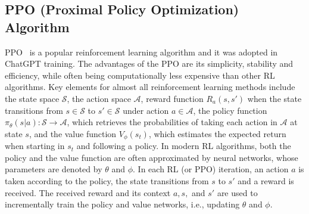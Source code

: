 \subsection{PPO (Proximal Policy Optimization) Algorithm}
\label{sec:ppo_background}

PPO~\cite{schulman2017PPOclip} is a popular reinforcement learning algorithm and it was adopted in ChatGPT training. The advantages of the PPO are its simplicity, stability and efficiency, while often being computationally less expensive than other RL algorithms. Key elements for almost all reinforcement learning methods include the state space $\mathcal{S}$, the action space $\mathcal{A}$, reward function $R_a(s, s')$ when the state transitions from $s\in \mathcal{S}$ to $s' \in \mathcal{S}$ under action $a \in \mathcal{A}$, the policy function $\pi_\theta(s|a){:}\mathcal{S} {\rightarrow} \mathcal{A}$, which retrieves the probabilities of taking each action in $\mathcal{A}$ at state $s$,
and the value function $V_\phi(s_t)$, which estimates the expected return when starting in $s_t$ and following a policy. In modern RL algorithms, both the policy and the value function are often approximated by neural networks, whose parameters are denoted by 
$\theta$ and $\phi$. In each RL (or PPO) iteration, an action $a$ is taken according to the policy, the state transitions from $s$
to $s'$ and a reward is received. The received reward and its context $a, s,$ and $s'$ are used to incrementally train the policy and value networks, i.e., updating $\theta$ and $\phi$.



